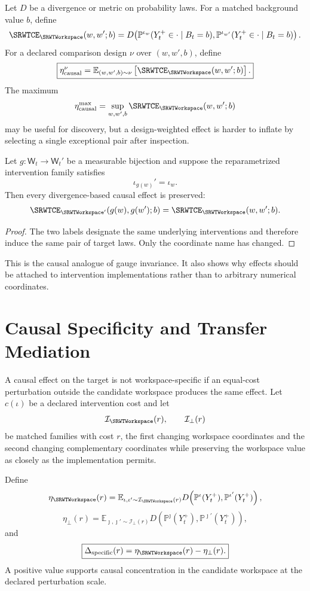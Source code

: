 Let \(D\) be a divergence or metric on probability laws. For a matched
background value \(b\), define
\[
\SRWTCE_{\SRWTWorkspace}(w,w';b)
=
D\!\left(
\mathbb P^{\iota_w}(Y_t^+\in\cdot\mid B_t=b),
\mathbb P^{\iota_{w'}}(Y_t^+\in\cdot\mid B_t=b)
\right).
\]
For a declared comparison design \(\nu\) over \((w,w',b)\), define
\[
\boxed{
\eta_{\mathrm{causal}}^{\nu}
=
\mathbb E_{(w,w',b)\sim\nu}
\left[
\SRWTCE_{\SRWTWorkspace}(w,w';b)
\right].
}
\]
The maximum
\[
\eta_{\mathrm{causal}}^{\max}
=
\sup_{w,w',b}\SRWTCE_{\SRWTWorkspace}(w,w';b)
\]
may be useful for discovery, but a design-weighted effect is harder to inflate
by selecting a single exceptional pair after inspection.

\begin{SRWTproposition}
\label{SRWT:prop:causal-gauge}
Let \(g:\mathsf W_t\to\mathsf W_t'\) be a measurable bijection and suppose the
reparametrized intervention family satisfies
\[
\iota_{g(w)}'=\iota_w.
\]
Then every divergence-based causal effect is preserved:
\[
\SRWTCE_{\SRWTWorkspace'}(g(w),g(w');b)
=
\SRWTCE_{\SRWTWorkspace}(w,w';b).
\]
\end{SRWTproposition}

\begin{proof}
The two labels designate the same underlying interventions and therefore induce
the same pair of target laws. Only the coordinate name has changed.
\end{proof}

This is the causal analogue of gauge invariance. It also shows why effects
should be attached to intervention implementations rather than to arbitrary
numerical coordinates.

\section{Causal Specificity and Transfer Mediation}

A causal effect on the target is not workspace-specific if an equal-cost
perturbation outside the candidate workspace produces the same effect. Let
\(c(\iota)\) be a declared intervention cost and let
\[
\mathcal I_{\SRWTWorkspace}(r),
\qquad
\mathcal I_{\perp}(r)
\]
be matched families with cost \(r\), the first changing workspace coordinates
and the second changing complementary coordinates while preserving the
workspace value as closely as the implementation permits.

Define
\[
\eta_{\SRWTWorkspace}(r)
=
\mathbb E_{\iota,\iota'\sim\mathcal I_{\SRWTWorkspace}(r)}
D\!\left(
\mathbb P^{\iota}(Y_t^+),
\mathbb P^{\iota'}(Y_t^+)
\right),
\]
\[
\eta_{\perp}(r)
=
\mathbb E_{\jmath,\jmath'\sim\mathcal I_{\perp}(r)}
D\!\left(
\mathbb P^{\jmath}(Y_t^+),
\mathbb P^{\jmath'}(Y_t^+)
\right),
\]
and
\[
\boxed{
\Delta_{\mathrm{specific}}(r)
=
\eta_{\SRWTWorkspace}(r)-\eta_{\perp}(r).
}
\]
A positive value supports causal concentration in the candidate workspace at
the declared perturbation scale.


